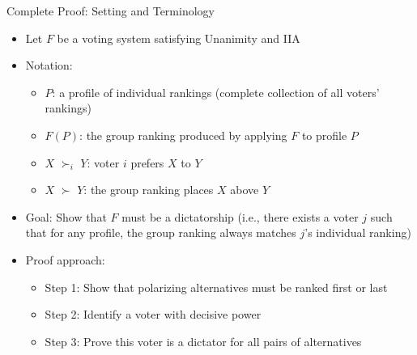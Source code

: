 \documentclass[10pt,handout]{beamer}
\begin{document}
\begin{frame}{Complete Proof: Setting and Terminology}
  \begin{itemize}[<+->]
    \item Let $F$ be a voting system satisfying Unanimity and IIA
    \item Notation:
      \begin{itemize}
        \item $P$: a profile of individual rankings (complete collection of all voters' rankings)
        \item $F(P)$: the group ranking produced by applying $F$ to profile $P$
        \item $X$ $\succ_i$ $Y$: voter $i$ prefers $X$ to $Y$
        \item $X$ $\succ$ $Y$: the group ranking places $X$ above $Y$
      \end{itemize}
    \item Goal: Show that $F$ must be a dictatorship (i.e., there exists a voter $j$ such that for any profile, the group ranking always matches $j$'s individual ranking)
    \item Proof approach: 
      \begin{itemize}
        \item Step 1: Show that polarizing alternatives must be ranked first or last
        \item Step 2: Identify a voter with decisive power
        \item Step 3: Prove this voter is a dictator for all pairs of alternatives
      \end{itemize}
  \end{itemize}
\end{frame}
\end{document}
